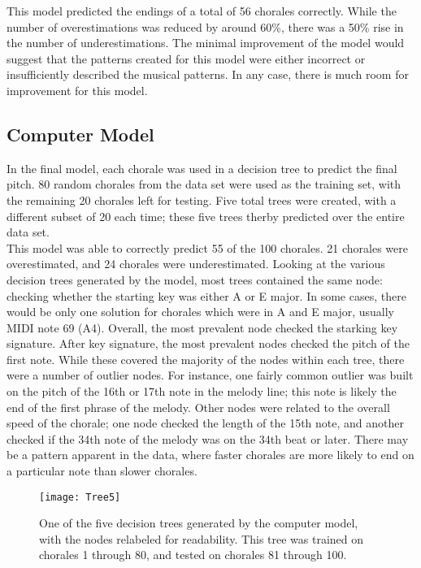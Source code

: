 \documentclass[12pt]{article}
\begin{document}
This model predicted the endings of a total of 56 chorales correctly. While the number of overestimations was reduced by around 60\%, there was a 50\% rise in the number of underestimations. The minimal improvement of the model would suggest that the patterns created for this model were either incorrect or insufficiently described the musical patterns. In any case, there is much room for improvement for this model.

\subsection{Computer Model}
In the final model, each chorale was used in a decision tree to predict the final pitch. 80 random chorales from the data set were used as the training set, with the remaining 20 chorales left for testing. Five total trees were created, with a different subset of 20 each time; these five trees therby predicted over the entire data set.\\

This model was able to correctly predict 55 of the 100 chorales. 21 chorales were overestimated, and 24 chorales were underestimated. Looking at the various decision trees generated by the model, most trees contained the same node: checking whether the starting key was either A or E major. In some cases, there would be only one solution for chorales which were in A and E major, usually MIDI note 69 (A4). Overall, the most prevalent node checked the starking key signature. After key signature, the most prevalent nodes checked the pitch of the first note. While these covered the majority of the nodes within each tree, there were a number of outlier nodes. For instance, one fairly common outlier was built on the pitch of the 16th or 17th note in the melody line; this note is likely the end of the first phrase of the melody. Other nodes were related to the overall speed of the chorale; one node checked the length of the 15th note, and another checked if the 34th note of the melody was on the 34th beat or later. There may be a pattern apparent in the data, where faster chorales are more likely to end on a particular note than slower chorales.\\
\begin{figure}[h]
  \texttt{[image: Tree5]}
  \centering
  \caption{One of the five decision trees generated by the computer model, with the nodes relabeled for readability. This tree was trained on chorales 1 through 80, and tested on chorales 81 through 100.}
\end{figure}
\end{document}
